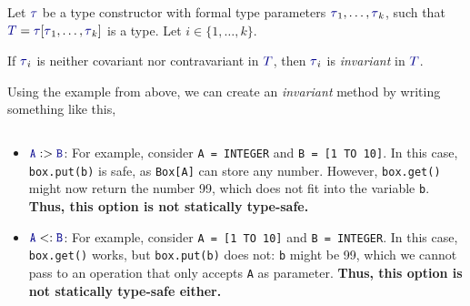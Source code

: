 \begin{definition}[Invariance]\label{def:Type_Invariance}
  Let $\DataType$ be a type constructor with formal type parameters $\DataType_{1}, \ldots , \DataType_{k}$, such that $\SemanticType{T} = \DataType [\DataType_{1}, \ldots, \DataType_{k}]$ is a type.
  Let $i \in \lbrace 1,\ldots, k \rbrace$.

  If $\DataType_{i}$ is neither covariant nor contravariant in $\SemanticType{T}$, then $\DataType_{i}$ is \emph{invariant} in $\SemanticType{T}$.

  Using the  example from above, we can create an \emph{invariant} method by writing something like this,
  \inputminted[frame=lines,linenos]{scala}{./EDAP05-Concepts_Programming_Languages-Sections/Advanced_Data_Types/Code/InvariantBox.scala}
  \begin{itemize}[noitemsep]
  \item $\mathtt{\SemanticType{A}} :> \mathtt{\SemanticType{B}}$: For example, consider \texttt{A = INTEGER} and \texttt{B = [1 TO 10]}.
    In this case, \texttt{box.put(b)} is safe, as \texttt{Box[A]} can store any number. However, \texttt{box.get()} might now return the number 99, which does not fit into the variable \texttt{b}.
    \textbf{Thus, this option is not statically type-safe.}
  \item $\mathtt{\SemanticType{A}} <: \mathtt{\SemanticType{B}}$: For example, consider \texttt{A = [1 TO 10]} and \texttt{B = INTEGER}.
    In this case, \texttt{box.get()} works, but \texttt{box.put(b)} does not: \texttt{b} might be 99, which we cannot pass to an operation that only accepts \texttt{A} as parameter.
    \textbf{Thus, this option is not statically type-safe either.}
  \end{itemize}
\end{definition}

